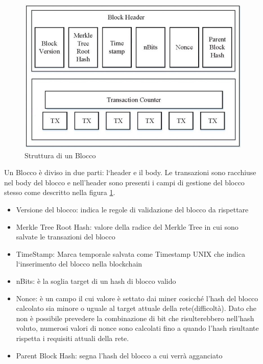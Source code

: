 \documentclass[11pt,a4paper,titlepage,twoside,openright]{report}
\begin{document}
\begin{figure}[h]
	\includegraphics[width=\textwidth]{bcbl}
	\centering
	\caption{Struttura di un Blocco}
	\label{fig:blockblockchain1}
\end{figure}

Un Blocco è diviso in due parti: l`header e il body. Le transazioni sono racchiuse nel body del blocco e nell'header sono presenti i campi di gestione del blocco stesso come descritto nella figura \ref{fig:blockblockchain1}.

\begin{itemize}
  \item Versione del blocco: indica le regole di validazione del blocco da rispettare
  \item Merkle Tree Root Hash: valore della radice del Merkle Tree in cui sono salvate le transazioni del blocco
  \item TimeStamp: Marca temporale salvata come Timestamp UNIX che indica l`inserimento del blocco nella blockchain
  \item nBits: è la soglia target di un hash di blocco valido
  \item Nonce: è un campo il cui valore è settato dai miner cosicché l’hash del blocco calcolato sia minore o uguale al target attuale della rete(difficoltà). Dato che non è possibile prevedere la combinazione di bit che risulterebbero nell’hash voluto, numerosi valori di nonce sono calcolati fino a quando l’hash risultante rispetta i requisiti attuali della rete.
\item Parent Block Hash: segna l'hash del blocco a cui verrà agganciato
\end{itemize}
\end{document}
